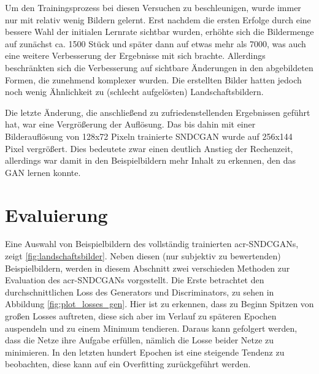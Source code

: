  Um den Trainingsprozess bei diesen Versuchen zu beschleunigen, wurde immer nur
 mit relativ wenig Bildern gelernt. Erst nachdem die ersten Erfolge durch eine
 bessere Wahl der initialen Lernrate sichtbar wurden, erhöhte sich die
 Bildermenge auf zunächst ca. 1500 Stück und später dann auf etwas mehr als
 7000, was auch eine weitere Verbesserung der Ergebnisse mit sich brachte.
 Allerdings beschränkten sich die Verbesserung auf sichtbare Änderungen in den
 abgebildeten Formen, die zunehmend komplexer wurden. Die erstellten Bilder
 hatten jedoch noch wenig Ähnlichkeit zu (schlecht aufgelösten)
 Landschaftsbildern.
 
 Die letzte Änderung, die anschließend zu zufriedenstellenden Ergebnissen
 geführt hat, war eine Vergrößerung der Auflösung. Das bis dahin mit einer
 Bilderauflösung von 128x72 Pixeln trainierte SNDCGAN wurde auf 256x144 Pixel
 vergrößert. Dies bedeutete zwar einen deutlich Anstieg der Rechenzeit,
 allerdings war damit in den Beispielbildern mehr Inhalt zu erkennen, den das
 GAN lernen konnte.
 
 \section{Evaluierung}\label{evalGen}
  Eine Auswahl von Beispielbildern des vollständig
  trainierten \gls{acr-SNDCGAN}s, zeigt \cref{fig:landschaftsbilder}. Neben diesen (nur
  subjektiv zu bewertenden) Beispielbildern, werden in diesem Abschnitt zwei verschieden
  Methoden zur Evaluation des \gls{acr-SNDCGAN}s vorgestellt. Die Erste betrachtet den
  durchschnittlichen Loss des Generators und Discriminators, zu sehen in
  Abbildung \ref{fig:plot_losses_gen}.  Hier ist zu erkennen, dass zu Beginn
  Spitzen von großen Losses auftreten, diese sich aber im Verlauf zu späteren
  Epochen auspendeln und zu einem Minimum tendieren. Daraus kann gefolgert
  werden, dass die Netze ihre Aufgabe erfüllen, nämlich die Losse beider Netze
  zu minimieren. In den letzten hundert Epochen ist eine steigende Tendenz zu
  beobachten, diese kann auf ein Overfitting zurückgeführt werden.
 

